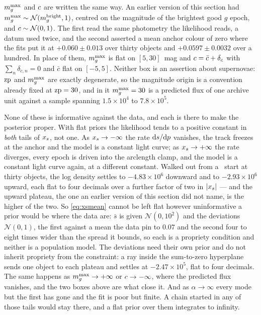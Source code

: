 \documentclass[11pt]{article}
\theoremstyle{plain}
\begin{document}
$m_{g}^{\max}$ and $c$ are written the same way. An earlier version of this section had
$m_{g}^{\max} \sim \mathcal{N}(m_{g}^{\mathrm{bright}}, 1)$, centred on the magnitude of the
brightest good $g$ epoch, and $c \sim \mathcal{N}(0, 1)$. The first read the same
photometry the likelihood reads, a datum used twice, and the second asserted a mean anchor
colour of zero where the fits put it at $+0.060 \pm 0.013$ over thirty objects and
$+0.0597 \pm 0.0032$ over a hundred. In place of them, $m_{g}^{\max}$ is flat on $[5, 30]$~mag
and $c = \bar c + \delta_{c}$ with $\sum_{n}\delta_{c,n} = 0$ and $\bar c$ flat on
$[-5, 5]$. Neither box is an assertion about supernovae: $\mathrm{zp}$ and $m_{g}^{\max}$ are exactly
degenerate, so the magnitude origin is a convention already fixed at $\mathrm{zp} = 30$, and in it
$m_{g}^{\max} = 30$ is a predicted flux of one archive unit against a sample spanning
$1.5\times10^{4}$ to $7.8\times10^{5}$.

None of these is informative against the data, and each is there to make the posterior
proper. With flat priors the likelihood tends to a positive constant in \emph{both} tails of
$x_{s}$, not one. As $x_{s} \to -\infty$ the rate $\mathrm{d}s/\mathrm{d}p$ vanishes, the
track freezes at the anchor and the model is a constant light curve; as
$x_{s} \to +\infty$ the rate diverges, every epoch is driven into the arclength clamp,
and the model is a constant light curve again, at a different constant. Walked out from a
\salt\ start at thirty objects, the log density settles to $-4.83\times10^{6}$ downward and
to $-2.93\times10^{6}$ upward, each flat to four decimals over a further factor of two in
$|x_{s}|$ --- and the upward plateau, the one an earlier version of this section did not
name, is the higher of the two. So \eqref{eq:xsmean} cannot be left flat however
uninformative a prior would be where the data are: $\bar s$ is given $\mathcal{N}(0, 10^{2})$
and the deviations $\mathcal{N}(0, 1)$, the first against a mean the data pin to $0.07$ and
the second four to eight times wider than the spread it bounds, so each is a propriety
condition and neither is a population model. The deviations need their own prior and do not
inherit propriety from the constraint: a ray inside the sum-to-zero hyperplane sends one
object to each plateau and settles at $-2.47\times10^{5}$, flat to four decimals.
The same happens as $m_{g}^{\max} \to +\infty$ or $c \to -\infty$, where the predicted flux
vanishes, and the two boxes above are what close it. And as $\alpha \to \infty$ every mode
but the first has gone and the fit is poor but finite. A chain started in any of those tails
would stay there, and a flat prior over them integrates to infinity.
\end{document}

